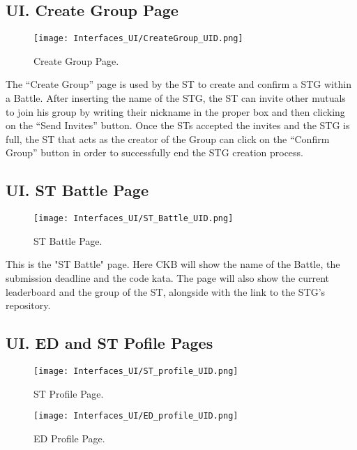 \subsection*{UI\cui . Create Group Page}

\begin{figure}[H]
    \begin{center}
        \texttt{[image: Interfaces\_UI/CreateGroup\_UID.png]}
        \caption{Create Group Page.}
        \label{fig:create_group_page}%
    \end{center}
\end{figure}

The “Create Group” page is used by the ST to create and confirm a STG within a Battle. After inserting the name of the STG, the ST can invite other mutuals to join his group by writing their nickname in the proper box and then clicking on the “Send Invites” button. Once the STs accepted the invites and the STG is full, the ST that acts as the creator of the Group can click on the “Confirm Group” button in order to successfully end the STG creation process. 

\subsection*{UI\cui . ST Battle Page}  

\begin{figure}[H]
    \begin{center}
        \texttt{[image: Interfaces\_UI/ST\_Battle\_UID.png]}
        \caption{ST Battle Page.}
        \label{fig:st_battle_page}%
    \end{center}
\end{figure}

This is the "ST Battle" page. Here CKB will show the name of the Battle, the submission deadline and the code kata. The page will also show the current leaderboard and the group of the ST, alongside with the link to the STG’s repository.

\subsection*{UI\cui . ED and ST Pofile Pages}

\begin{figure}[H]
    \begin{center}
        \texttt{[image: Interfaces\_UI/ST\_profile\_UID.png]}
        \caption{ST Profile Page.}
        \label{fig:st_profile_page}%
    \end{center}

    \begin{center}
        \texttt{[image: Interfaces\_UI/ED\_profile\_UID.png]}
        \caption{ED Profile Page.}
        \label{fig:ed_profile_page}%
    \end{center}
\end{figure}

